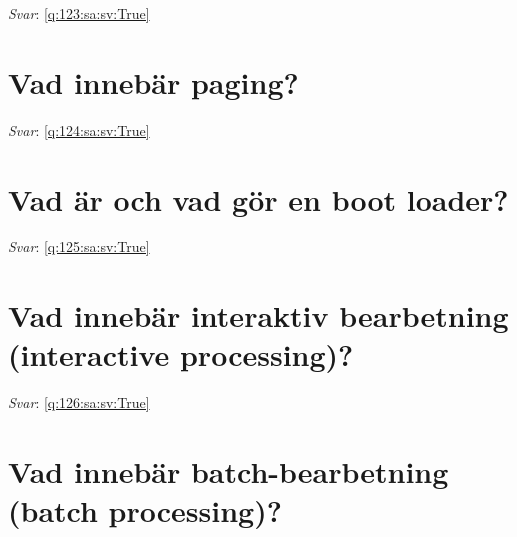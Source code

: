 \documentclass[a4paper,11pt,oneside]{book}
\begin{document}
\begin{sloppypar}
\vspace{1cm}

\textit{Svar}: \autoref{q:123:sa:sv:True}



\section{Vad inneb\"ar paging?}

\label{q:124:sa:sv:False}

\vspace{2cm}

\noindent\makebox[\textwidth]{\hrulefill}

\vspace{1cm}

\textit{Svar}: \autoref{q:124:sa:sv:True}



\section{Vad \"ar och vad g\"or en boot loader?}

\label{q:125:sa:sv:False}

\vspace{2cm}

\noindent\makebox[\textwidth]{\hrulefill}

\vspace{1cm}

\textit{Svar}: \autoref{q:125:sa:sv:True}



\section{Vad inneb\"ar interaktiv bearbetning (interactive processing)?}

\label{q:126:sa:sv:False}

\vspace{2cm}

\noindent\makebox[\textwidth]{\hrulefill}

\vspace{1cm}

\textit{Svar}: \autoref{q:126:sa:sv:True}



\section{Vad inneb\"ar batch-bearbetning (batch processing)?}


\end{sloppypar}
\end{document}
